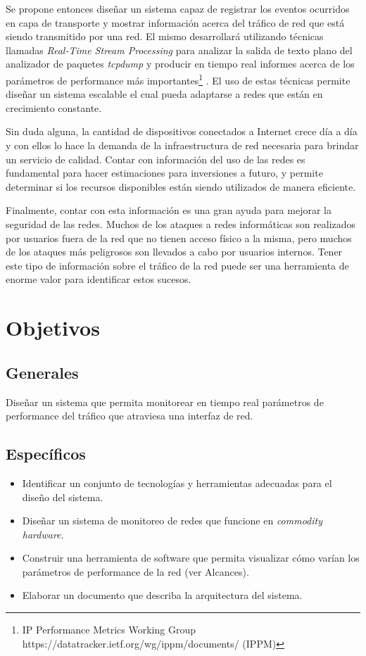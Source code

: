Se propone entonces diseñar un sistema capaz de registrar los eventos ocurridos en capa de transporte y mostrar información acerca del tráfico de red que está siendo transmitido por una red. El mismo desarrollará utilizando técnicas llamadas \textit{Real-Time Stream Processing} para analizar la salida de texto plano del analizador de paquetes \textit{tcpdump} y producir en tiempo real informes acerca de los parámetros de performance más importantes\footnote{IP Performance Metrics Working Group https://datatracker.ietf.org/wg/ippm/documents/ (IPPM)}
. El uso de estas técnicas permite diseñar un sistema escalable el cual pueda adaptarse a redes que están en crecimiento constante.

Sin duda alguna, la cantidad de dispositivos conectados a Internet crece día a día y con ellos lo hace la demanda de la infraestructura de red necesaria para brindar un servicio de calidad. Contar con información del uso de las redes es fundamental para hacer estimaciones para inversiones a futuro, y permite determinar si los recursos disponibles están siendo utilizados de manera eficiente.

Finalmente, contar con esta información es una gran ayuda para mejorar la seguridad de las redes. Muchos de los ataques a redes informáticas son realizados por usuarios fuera de la red que no tienen acceso físico a la misma, pero muchos de los ataques más peligrosos son llevados a cabo por usuarios internos. Tener este tipo de información sobre el tráfico de la red puede ser una herramienta de enorme valor para identificar estos sucesos.

\section*{Objetivos}
\subsection*{Generales}
Diseñar un sistema que permita monitorear en tiempo real parámetros de performance del tráfico que atraviesa una interfaz de red.
\subsection*{Específicos}
\begin{itemize}

\item Identificar un conjunto de tecnologías y herramientas adecuadas para el diseño del sistema.
\item Diseñar un sistema de monitoreo de redes que funcione en \textit{commodity hardware}.
\item Construir una herramienta de software que permita visualizar cómo varían los parámetros de performance de la red (ver Alcances).
\item Elaborar un documento que describa la arquitectura del sistema.
\end{itemize}

